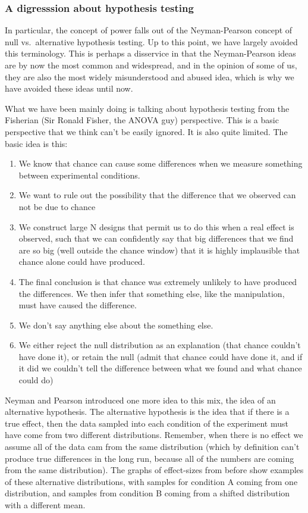 \documentclass[
  letterpaper,
  DIV=11,
  numbers=noendperiod]{scrartcl}
\providecommand{\tightlist}{%
  \setlength{\itemsep}{0pt}\setlength{\parskip}{0pt}}\usepackage{longtable,booktabs,array}
\begin{document}
\hypertarget{a-digresssion-about-hypothesis-testing}{%
\subsubsection{A digresssion about hypothesis
testing}\label{a-digresssion-about-hypothesis-testing}}

In particular, the concept of power falls out of the Neyman-Pearson
concept of null vs.~alternative hypothesis testing. Up to this point, we
have largely avoided this terminology. This is perhaps a disservice in
that the Neyman-Pearson ideas are by now the most common and widespread,
and in the opinion of some of us, they are also the most widely
misunderstood and abused idea, which is why we have avoided these ideas
until now.

What we have been mainly doing is talking about hypothesis testing from
the Fisherian (Sir Ronald Fisher, the ANOVA guy) perspective. This is a
basic perspective that we think can't be easily ignored. It is also
quite limited. The basic idea is this:

\begin{enumerate}
\def\labelenumi{\arabic{enumi}.}
\tightlist
\item
  We know that chance can cause some differences when we measure
  something between experimental conditions.
\item
  We want to rule out the possibility that the difference that we
  observed can not be due to chance
\item
  We construct large N designs that permit us to do this when a real
  effect is observed, such that we can confidently say that big
  differences that we find are so big (well outside the chance window)
  that it is highly implausible that chance alone could have produced.
\item
  The final conclusion is that chance was extremely unlikely to have
  produced the differences. We then infer that something else, like the
  manipulation, must have caused the difference.
\item
  We don't say anything else about the something else.
\item
  We either reject the null distribution as an explanation (that chance
  couldn't have done it), or retain the null (admit that chance could
  have done it, and if it did we couldn't tell the difference between
  what we found and what chance could do)
\end{enumerate}

Neyman and Pearson introduced one more idea to this mix, the idea of an
alternative hypothesis. The alternative hypothesis is the idea that if
there is a true effect, then the data sampled into each condition of the
experiment must have come from two different distributions. Remember,
when there is no effect we assume all of the data cam from the same
distribution (which by definition can't produce true differences in the
long run, because all of the numbers are coming from the same
distribution). The graphs of effect-sizes from before show examples of
these alternative distributions, with samples for condition A coming
from one distribution, and samples from condition B coming from a
shifted distribution with a different mean.
\end{document}
